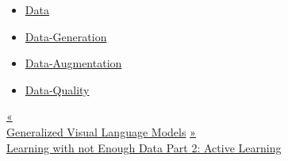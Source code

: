 \begin{itemize}
\tightlist
\item
  \href{https://lilianweng.github.io/tags/data/}{Data}
\item
  \href{https://lilianweng.github.io/tags/data-generation/}{Data-Generation}
\item
  \href{https://lilianweng.github.io/tags/data-augmentation/}{Data-Augmentation}
\item
  \href{https://lilianweng.github.io/tags/data-quality/}{Data-Quality}
\end{itemize}

\href{https://lilianweng.github.io/posts/2022-06-09-vlm/}{{« }\\
{Generalized Visual Language Models}} \href{https://lilianweng.github.io/posts/2022-02-20-active-learning/}{{ »}\\
{Learning with not Enough Data Part 2: Active Learning}}

